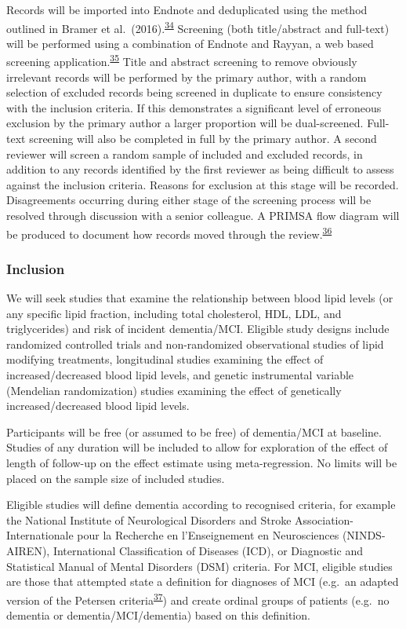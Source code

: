 \documentclass[a4paper, twoside]{templates/ociamthesis}
\begin{document}
Records will be imported into Endnote and deduplicated using the method outlined in Bramer et al.~(2016).\textsuperscript{\protect\hyperlink{ref-bramer2016}{34}} Screening (both title/abstract and full-text) will be performed using a combination of Endnote and Rayyan, a web based screening application.\textsuperscript{\protect\hyperlink{ref-ouzzani2016}{35}}
Title and abstract screening to remove obviously irrelevant records will be performed by the primary author, with a random selection of excluded records being screened in duplicate to ensure consistency with the inclusion criteria. If this demonstrates a significant level of erroneous exclusion by the primary author a larger proportion will be dual-screened.
Full-text screening will also be completed in full by the primary author. A second reviewer will screen a random sample of included and excluded records, in addition to any records identified by the first reviewer as being difficult to assess against the inclusion criteria. Reasons for exclusion at this stage will be recorded. Disagreements occurring during either stage of the screening process will be resolved through discussion with a senior colleague. A PRIMSA flow diagram will be produced to document how records moved through the review.\textsuperscript{\protect\hyperlink{ref-zotero-766}{36}}

\hypertarget{inclusion}{%
\subsubsection{Inclusion}\label{inclusion}}

We will seek studies that examine the relationship between blood lipid levels (or any specific lipid fraction, including total cholesterol, HDL, LDL, and triglycerides) and risk of incident dementia/MCI. Eligible study designs include randomized controlled trials and non-randomized observational studies of lipid modifying treatments, longitudinal studies examining the effect of increased/decreased blood lipid levels, and genetic instrumental variable (Mendelian randomization) studies examining the effect of genetically increased/decreased blood lipid levels.

Participants will be free (or assumed to be free) of dementia/MCI at baseline. Studies of any duration will be included to allow for exploration of the effect of length of follow-up on the effect estimate using meta-regression. No limits will be placed on the sample size of included studies.

Eligible studies will define dementia according to recognised criteria, for example the National Institute of Neurological Disorders and Stroke Association-Internationale pour la Recherche en l'Enseignement en Neurosciences (NINDS-AIREN), International Classification of Diseases (ICD), or Diagnostic and Statistical Manual of Mental Disorders (DSM) criteria. For MCI, eligible studies are those that attempted state a definition for diagnoses of MCI (e.g.~an adapted version of the Petersen criteria\textsuperscript{\protect\hyperlink{ref-petersen1999}{37}}) and create ordinal groups of patients (e.g.~no dementia or dementia/MCI/dementia) based on this definition.
\end{document}
